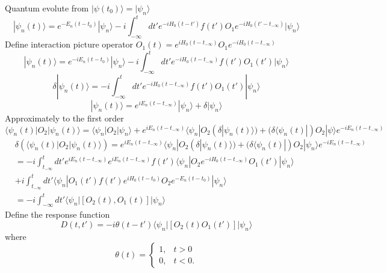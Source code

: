 \documentclass[a4paper,11pt]{article}
\begin{document}
Quantum evolute from $|\psi(t_0)\rangle=|\psi_n\rangle$
\begin{equation*}
  |\psi_n(t)\rangle=e^{-E_n(t-t_0)}|\psi_n\rangle-i\int_{-\infty}^{t}dt'e^{-iH_0(t-t')}f(t')O_1e^{-iH_0(t'-t_{-\infty})}|\psi_n\rangle
\end{equation*}
Define interaction picture operator $O_1(t)=e^{iH_0(t-t_{-\infty})}O_1e^{-iH_0(t-t_{-\infty})}$
\begin{equation*}
  |\psi_n(t)\rangle=e^{-iE_n(t-t_0)}|\psi_n\rangle-i\int_{-\infty}^{t}dt'e^{-iH_0(t-t_{-\infty})}f(t')O_1(t')|\psi_n\rangle
\end{equation*}
\begin{equation*}
  \delta|\psi_n(t)\rangle=-i\int_{-\infty}^{t}dt'e^{-iH_0(t-t_{-\infty})}f(t')O_1(t')|\psi_n\rangle
\end{equation*}
\begin{equation*}
  |\psi_n(t)\rangle=e^{iE_n(t-t_{-\infty})}|\psi_n\rangle+\delta|\psi_n\rangle
\end{equation*}
Approximately to the first order
\begin{equation*}
  \langle\psi_n(t)|O_2|\psi_n(t)\rangle=\langle\psi_n|O_2|\psi_n\rangle+e^{iE_n(t-t_{-\infty})}\langle\psi_n|O_2(\delta|\psi_n(t)\rangle)+(\delta\langle\psi_n(t)|)O_2|\psi\rangle e^{-iE_n(t-t_{-\infty})}
\end{equation*}
\begin{equation*}
  \begin{split}
     &\delta(\langle\psi_n(t)|O_2|\psi_n(t)\rangle)=e^{iE_n(t-t_{-\infty})}\langle\psi_n|O_2(\delta|\psi_n(t)\rangle)+(\delta\langle\psi_n(t)|)O_2|\psi_n\rangle e^{-iE_n(t-t_{-\infty})}\\
       &=-i\int_{t_{-\infty}}^{t}dt'e^{iE_n(t-t_{-\infty})}e^{iE_n(t-t_{-\infty})}f(t')\langle\psi_n|O_2e^{-iH_0(t-t_{-\infty})}O_1(t')|\psi_n\rangle\\
       &+i\int_{t_{-\infty}}^{t}dt'\langle\psi_n|O_1(t')f(t')e^{iH_0(t-t_0)}O_2e^{-E_n(t-t_0)}|\psi_n\rangle\\
       &=-i\int_{-\infty}^{t}dt'\langle\psi_n|\left[O_2(t),O_1(t)\right]|\psi_n\rangle
  \end{split}
\end{equation*}
Define the response function
\begin{equation*}
  D(t,t')=-i\theta(t-t')\langle\psi_n|\left[O_2(t)O_1(t')\right]|\psi_n\rangle
\end{equation*}
where
\begin{equation*}
  \theta(t)=\begin{cases}
    1, & t>0 \\
    0, & t<0.
  \end{cases}
\end{equation*}
\end{document}
